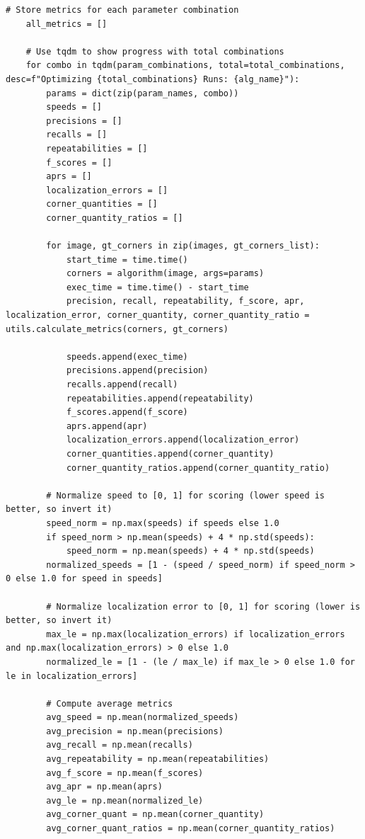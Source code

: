 \documentclass[journal]{IEEEtran}
\begin{document}
\begin{lstlisting}[style=python, caption={Driver Script for Project}, label={lst:driver}]
    # Store metrics for each parameter combination
    all_metrics = []
    
    # Use tqdm to show progress with total combinations
    for combo in tqdm(param_combinations, total=total_combinations, desc=f"Optimizing {total_combinations} Runs: {alg_name}"):
        params = dict(zip(param_names, combo))
        speeds = []
        precisions = []
        recalls = []
        repeatabilities = []
        f_scores = []
        aprs = []
        localization_errors = []
        corner_quantities = []
        corner_quantity_ratios = []
        
        for image, gt_corners in zip(images, gt_corners_list):
            start_time = time.time()
            corners = algorithm(image, args=params)
            exec_time = time.time() - start_time
            precision, recall, repeatability, f_score, apr, localization_error, corner_quantity, corner_quantity_ratio = utils.calculate_metrics(corners, gt_corners)
            
            speeds.append(exec_time)
            precisions.append(precision)
            recalls.append(recall)
            repeatabilities.append(repeatability)
            f_scores.append(f_score)
            aprs.append(apr)
            localization_errors.append(localization_error)
            corner_quantities.append(corner_quantity)
            corner_quantity_ratios.append(corner_quantity_ratio)
            
        # Normalize speed to [0, 1] for scoring (lower speed is better, so invert it)
        speed_norm = np.max(speeds) if speeds else 1.0
        if speed_norm > np.mean(speeds) + 4 * np.std(speeds):
            speed_norm = np.mean(speeds) + 4 * np.std(speeds)
        normalized_speeds = [1 - (speed / speed_norm) if speed_norm > 0 else 1.0 for speed in speeds]
        
        # Normalize localization error to [0, 1] for scoring (lower is better, so invert it)
        max_le = np.max(localization_errors) if localization_errors and np.max(localization_errors) > 0 else 1.0
        normalized_le = [1 - (le / max_le) if max_le > 0 else 1.0 for le in localization_errors]
        
        # Compute average metrics
        avg_speed = np.mean(normalized_speeds)
        avg_precision = np.mean(precisions)
        avg_recall = np.mean(recalls)
        avg_repeatability = np.mean(repeatabilities)
        avg_f_score = np.mean(f_scores)
        avg_apr = np.mean(aprs)
        avg_le = np.mean(normalized_le)
        avg_corner_quant = np.mean(corner_quantity)
        avg_corner_quant_ratios = np.mean(corner_quantity_ratios)
        

\end{lstlisting}
\end{document}
